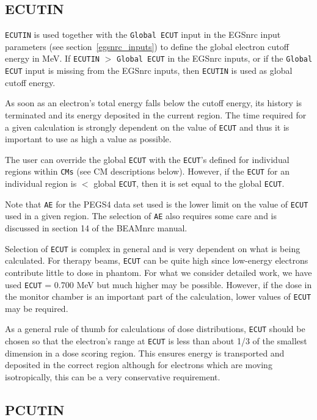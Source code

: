 \documentclass[12pt,twoside]{article}      %
\newcommand{\indexm}[1]{\index{#1}}
\begin{document}
\subsection{ECUTIN}
\indexm{ECUTIN}
\label{ECUTIN}
\indexm{ECUT}

\verb+ECUTIN+ is used together with the {\tt Global ECUT} input in the
EGSnrc input parameters (see section~\ref{egsnrc_inputs}) to define the
global electron cutoff energy in MeV.
If {\tt ECUTIN} $>$ {\tt Global ECUT}
in the EGSnrc inputs, or if the {\tt Global ECUT} input is missing from the
EGSnrc inputs, then {\tt ECUTIN} is used as global cutoff energy.

As soon as an electron's total energy falls below the cutoff energy, its
history is terminated and its energy deposited in the current region.
The time required for a given calculation is strongly dependent on the
value of \verb+ECUT+ and thus it is important to use as high a value
as possible.

The user can override
the global \verb+ECUT+ with the \verb+ECUT+'s defined for individual regions within
\verb+CMs+ (see CM descriptions below).  However, if the \verb+ECUT+ for an
individual region is $<$ global \verb+ECUT+, then it is set equal to the
global \verb+ECUT+.

Note that \verb+AE+ for the PEGS4 data set used is the lower limit on
the value of \verb+ECUT+ used in a given region.  The selection of
\verb+AE+ also requires some care and is discussed in section 14 of
the BEAMnrc manual.
 

Selection of \verb+ECUT+ is complex in general and is very dependent on
what is being calculated\cite{Ro84,RB90}.  For therapy beams,
\verb+ECUT+ can be quite high since low-energy electrons contribute
little to dose in phantom.  For what we consider detailed work, we have
used \verb+ECUT+ = 0.700 MeV but much higher may be possible.  However,
if the dose in the monitor chamber is an important part of the
calculation, lower values of \verb+ECUT+ may be required.

As a general rule of thumb for calculations of dose distributions,
\verb+ECUT+ should be chosen so that the electron's range at \verb+ECUT+
is less than about 1/3 of the smallest dimension in a dose scoring region.
This ensures energy is transported and deposited in the correct region
although for electrons which are moving isotropically, this can be a
very conservative requirement.

\subsection{PCUTIN}
\indexm{PCUTIN}
\label{PCUTIN}
\indexm{PCUT}
\end{document}
